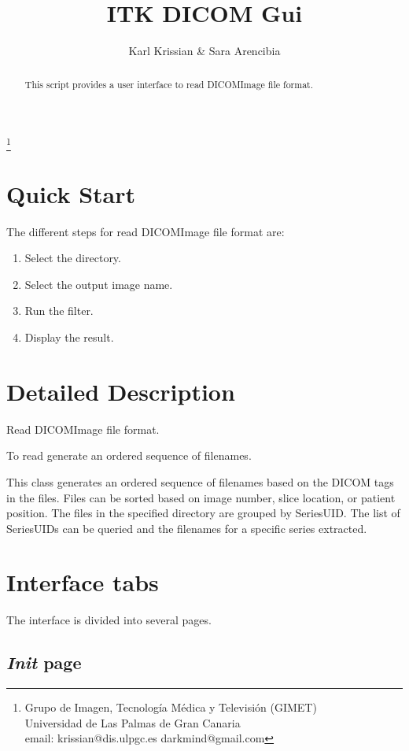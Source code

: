\documentclass{article}
\begin{document}
\title{ITK DICOM Gui}
\author{Karl Krissian \& Sara Arencibia}
\thanks{
Grupo de Imagen, Tecnolog\'ia M\'edica y Televisi\'on (GIMET)\\
Universidad de Las Palmas de Gran Canaria\\
email: krissian@dis.ulpgc.es darkmind@gmail.com
}


\maketitle

\begin{abstract}
This script provides a user interface to read DICOMImage file format.
\end{abstract}


\section{Quick Start}

The different steps for read DICOMImage file format are:
\begin{enumerate}
  \item Select the directory.
  \item Select the output image name.
  \item Run the filter.
  \item Display the result.
\end{enumerate}


\section{Detailed Description}
Read DICOMImage file format.

To read generate an ordered sequence of filenames.

This class generates an ordered sequence of filenames based on the DICOM tags in the files. Files can be sorted based on image number, slice location, or patient position. The files in the specified directory are grouped by SeriesUID. The list of SeriesUIDs can be queried and the filenames for a specific series extracted.  

\section{Interface tabs}

The interface is divided into several pages.

\subsection{\emph{Init} page}
\end{document}
